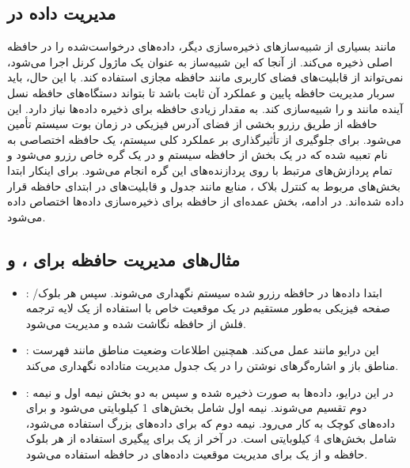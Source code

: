 \documentclass[12pt]{article}
\begin{document}
\subsection*{مدیریت داده در }
 مانند بسیاری از شبیه‌سازهای ذخیره‌سازی دیگر، داده‌های درخواست‌شده را در حافظه اصلی  ذخیره می‌کند. از آنجا که این شبیه‌ساز به عنوان یک ماژول کرنل اجرا می‌شود، نمی‌تواند از قابلیت‌های فضای کاربری  مانند حافظه مجازی استفاده کند. با این حال، باید سربار مدیریت حافظه پایین و عملکرد آن ثابت باشد تا بتواند دستگاه‌های حافظه نسل آینده مانند  و  را شبیه‌سازی کند. \newline
{} به مقدار زیادی حافظه برای ذخیره داده‌ها نیاز دارد. این حافظه از طریق رزرو بخشی از فضای آدرس فیزیکی در زمان بوت سیستم تأمین می‌شود. برای جلوگیری از تأثیرگذاری بر عملکرد کلی سیستم، یک حافظه اختصاصی به نام  تعبیه شده که در یک بخش از حافظه سیستم و در یک گره خاص  رزرو می‌شود و تمام پردازش‌های مرتبط با   روی پردازنده‌های این گره انجام می‌شود. برای اینکار ابتدا بخش‌های مربوط به کنترل بلاک ، منابع  مانند جدول  و قابلیت‌های  در ابتدای حافظه قرار داده شده‌اند. در ادامه، بخش عمده‌ای از حافظه برای ذخیره‌سازی داده‌ها اختصاص داده می‌شود. \newline

\subsection*{مثال‌های مدیریت حافظه برای ،  و }
\begin{itemize}
    \item \textbf{}: ابتدا داده‌ها در حافظه رزرو شده سیستم نگهداری می‌شوند. سپس هر بلوک/صفحه فیزیکی به‌طور مستقیم در یک موقعیت خاص با استفاده از یک لایه ترجمه فلش  از حافظه نگاشت شده و مدیریت می‌شود.
    \item \textbf{}: این درایو مانند  عمل می‌کند. همچنین اطلاعات وضعیت مناطق  مانند فهرست مناطق باز و اشاره‌گرهای نوشتن  را در یک جدول مدیریت متاداده نگهداری می‌کند.
    \item \textbf{}: در این درایو، داده‌ها به صورت  ذخیره شده و سپس به دو بخش نیمه اول و نیمه دوم تقسیم می‌شوند. نیمه اول شامل بخش‌های 1 کیلوبایتی می‌شود و برای داده‌های کوچک به کار می‌رود. نیمه دوم که برای داده‌های بزرگ استفاده می‌شود، شامل بخش‌های 4 کیلوبایتی است. در آخر از یک  برای پیگیری استفاده از هر بلوک حافظه و از یک  برای مدیریت موقعیت داده‌های  در حافظه استفاده می‌شود.
\end{itemize}
\end{document}
